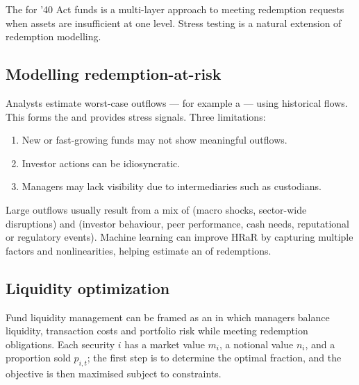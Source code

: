 The  for '40 Act funds is a multi-layer approach to
meeting redemption requests when assets are insufficient at one level. Stress
testing is a natural extension of redemption modelling.

\subsection{Modelling redemption-at-risk}

Analysts estimate worst-case outflows --- for example a  --- using historical flows. This forms the 
and provides stress signals. Three limitations:

\begin{enumerate}[label=\alph*)]
\item {} New or fast-growing funds may not show meaningful
outflows.
\item {} Investor actions can be idiosyncratic.
\item {} Managers may lack visibility due to intermediaries such as
custodians.
\end{enumerate}

Large outflows usually result from a mix of  (macro shocks,
sector-wide disruptions) and  (investor behaviour, peer
performance, cash needs, reputational or regulatory events). Machine learning can
improve HRaR by capturing multiple factors and nonlinearities, helping estimate an
 of redemptions.

\subsection{Liquidity optimization}

Fund liquidity management can be framed as an  in which
managers balance liquidity, transaction costs and portfolio risk while meeting
redemption obligations. Each security $i$ has a market value $m_i$, a notional
value $n_i$, and a proportion sold $p_{i,t}$; the first step is to determine the
optimal  fraction, and the objective is then maximised subject to
constraints.


